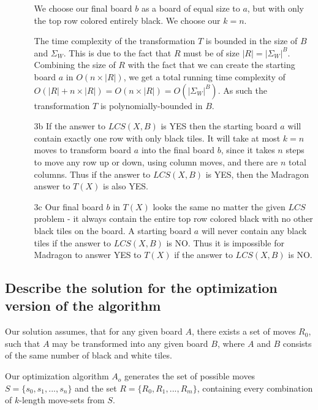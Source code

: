 \documentclass[12pt]{article}
\begin{document}
\begin{enumerate}
\begin{enumerate}
        We choose our final board $b$ as a board of equal size to $a$, but with only the top row colored entirely black. We choose our $k = n$.

        The time complexity of the transformation $T$ is bounded in the size of $B$ and $\Sigma_W$. This is due to the fact that $R$ must be of size $|R| = |\Sigma_W|^B$. Combining the size of $R$ with the fact that we can create the starting board $a$ in $O(n \times |R|)$, we get a total running time complexity of $O(|R|+n \times |R|) = O(n \times |R|) = O(|\Sigma_W|^B)$. As such the transformation $T$ is polynomially-bounded in $B$.

        \item[3b]
        If the answer to $LCS(X, B)$ is YES then the starting board $a$ will contain exactly one row with only black tiles. It will take at most $k = n$ moves to transform board $a$ into the final board $b$, since it takes $n$ steps to move any row up or down, using column moves, and there are $n$ total columns. Thus if the answer to $LCS(X, B)$ is YES, then the Madragon answer to $T(X)$ is also YES.

        \item[3c]
        Our final board $b$ in $T(X)$ looks the same no matter the given $LCS$ problem - it always contain the entire top row colored black with no other black tiles on the board. A starting board $a$ will never contain any black tiles if the answer to $LCS(X, B)$ is NO. Thus it is impossible for Madragon to answer YES to $T(X)$ if the answer to $LCS(X, B)$ is NO.

    \end{enumerate}

\end{enumerate}

\subsection{Describe the solution for the optimization version of the algorithm}
\label{sub:Describe the solution for the optimization version of the algorithm}

Our solution assumes, that for any given board $A$, there exists a set of moves $R_0$, such that $A$ may be transformed into any given board $B$, where $A$ and $B$ consists of the same number of black and white tiles.

Our optimization algorithm $A_o$ generates the set of possible moves $S = \{s_0, s_1, ...,s_n\}$ and the set $R = \{R_0, R_1, ..., R_m\}$, containing every combination of $k$-length move-sets from $S$.
\end{document}

